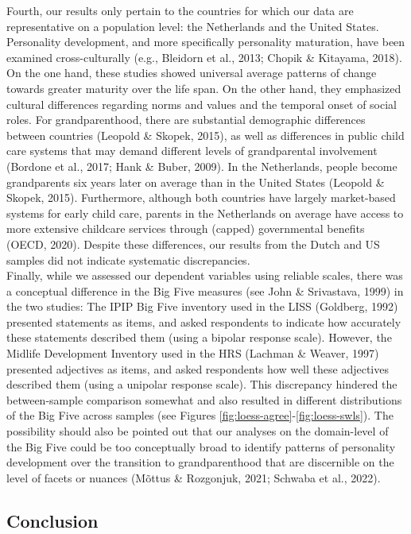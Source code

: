\documentclass[
  english,
  man,floatsintext]{apa7}
\begin{document}
Fourth, our results only pertain to the countries for which our data are representative on a population level: the Netherlands and the United States. Personality development, and more specifically personality maturation, have been examined cross-culturally (e.g., Bleidorn et al., 2013; Chopik \& Kitayama, 2018). On the one hand, these studies showed universal average patterns of change towards greater maturity over the life span. On the other hand, they emphasized cultural differences regarding norms and values and the temporal onset of social roles. For grandparenthood, there are substantial demographic differences between countries (Leopold \& Skopek, 2015), as well as differences in public child care systems that may demand different levels of grandparental involvement (Bordone et al., 2017; Hank \& Buber, 2009). In the Netherlands, people become grandparents six years later on average than in the United States (Leopold \& Skopek, 2015). Furthermore, although both countries have largely market-based systems for early child care, parents in the Netherlands on average have access to more extensive childcare services through (capped) governmental benefits (OECD, 2020). Despite these differences, our results from the Dutch and US samples did not indicate systematic discrepancies.\\
Finally, while we assessed our dependent variables using reliable scales, there was a conceptual difference in the Big Five measures (see John \& Srivastava, 1999) in the two studies: The IPIP Big Five inventory used in the LISS (Goldberg, 1992) presented statements as items, and asked respondents to indicate how accurately these statements described them (using a bipolar response scale). However, the Midlife Development Inventory used in the HRS (Lachman \& Weaver, 1997) presented adjectives as items, and asked respondents how well these adjectives described them (using a unipolar response scale). This discrepancy hindered the between-sample comparison somewhat and also resulted in different distributions of the Big Five across samples (see Figures \ref{fig:loess-agree}-\ref{fig:loess-swls}). The possibility should also be pointed out that our analyses on the domain-level of the Big Five could be too conceptually broad to identify patterns of personality development over the transition to grandparenthood that are discernible on the level of facets or nuances (Mõttus \& Rozgonjuk, 2021; Schwaba et al., 2022).

\hypertarget{conclusion}{%
\subsection{Conclusion}\label{conclusion}}
\end{document}
